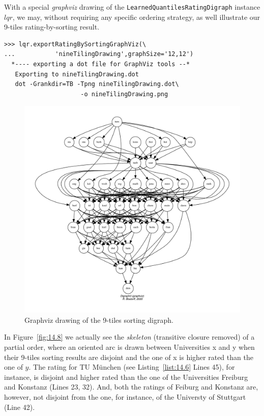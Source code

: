 With a special \emph{graphviz} drawing of the \texttt{LearnedQuantilesRatingDigraph} instance $lqr$, we may, without requiring any specific ordering strategy, as well illustrate our 9-tiles rating-by-sorting result.
\begin{lstlisting}
>>> lqr.exportRatingBySortingGraphViz(\
...           'nineTilingDrawing',graphSize='12,12')
  *---- exporting a dot file for GraphViz tools --*
   Exporting to nineTilingDrawing.dot
   dot -Grankdir=TB -Tpng nineTilingDrawing.dot\
                     -o nineTilingDrawing.png
\end{lstlisting}
\begin{figure}[ht]
\includegraphics[width=\hsize]{Figures/14-8-nineTilingDrawing.pdf}
\caption{Graphviz drawing of the 9-tiles sorting digraph.}
\label{fig:14.8}       %
\end{figure}
\clearpage

In Figure~\vref{fig:14.8} we actually see the \emph{skeleton} (transitive closure removed) of a partial order, where an oriented arc is drawn between Universities x and y when their 9-tiles sorting results are disjoint and the one of x is higher rated than the one of $y$. The rating for TU München (see Listing~\vref{list:14.6} Lines 45), for instance, is disjoint and higher rated than the one of the Universities Freiburg and Konstanz (Lines 23, 32). And, both the ratings of Feiburg and Konstanz are, however, not disjoint from the one, for instance, of the Universty of Stuttgart (Line 42).

